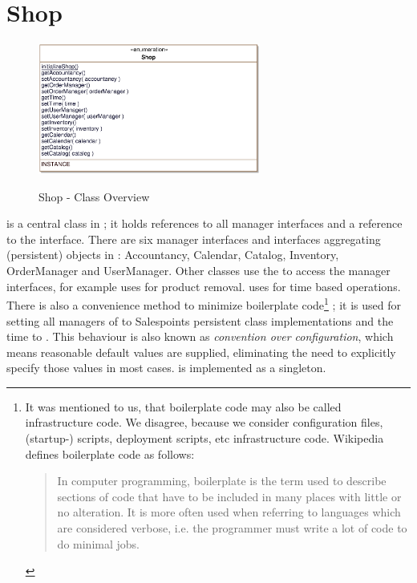 \section{Shop}
\label{shop}
\label{sec:shop}

\begin{figure}[ht]
	\centering
  \includegraphics[width=0.65\textwidth]{images/Shop_Overview.eps}
	\label{shop_overview}
	\caption{Shop - Class Overview}
\end{figure}
 is a central class in \salespoint{}; it holds references to all manager interfaces and a reference to the  interface.
There are six manager interfaces and interfaces aggregating (persistent) objects in \salespoint{}: Accountancy, Calendar, Catalog, Inventory, OrderManager and UserManager.
Other classes use the  to access the manager interfaces, for example  uses  for product removal.
 uses  for time based operations.
There is also a convenience method to minimize boilerplate code\footnote{
	It was mentioned to us, that boilerplate code may also be called infrastructure code.
	We disagree, because we consider configuration files, (startup-) scripts, deployment scripts, etc infrastructure code.
	Wikipedia defines boilerplate code as follows:
	\begin{quote}
		In computer programming, boilerplate is the term used to describe sections of code that have to be included in many places with little or no alteration.
		It is more often used when referring to languages which are considered verbose, i.e. the programmer must write a lot of code to do minimal jobs.
	\end{quote}}
;
it is used for setting all managers of  to Salespoints persistent class implementations and the time to .
This behaviour is also known as \textit{convention over configuration}, which means reasonable default values are supplied, eliminating the need to explicitly specify those values in most cases.
 is implemented as a singleton.
